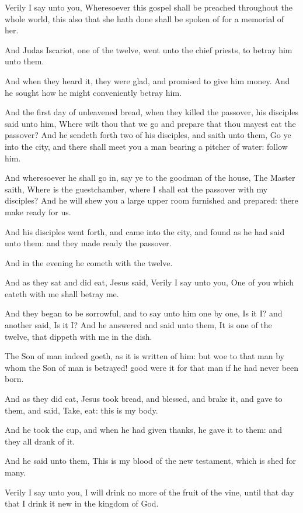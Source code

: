\Verse Verily I say unto you, Wheresoever this gospel shall be preached throughout the whole world, this also that she hath done shall be spoken of for a memorial of her.

\Verse And Judas Iscariot, one of the twelve, went unto the chief priests, to betray him unto them.

\Verse And when they heard it, they were glad, and promised to give him money. And he sought how he might conveniently betray him.

\Verse And the first day of unleavened bread, when they killed the passover, his disciples said unto him, Where wilt thou that we go and prepare that thou mayest eat the passover?  \Verse And he sendeth forth two of his disciples, and saith unto them, Go ye into the city, and there shall meet you a man bearing a pitcher of water: follow him.

\Verse And wheresoever he shall go in, say ye to the goodman of the house, The Master saith, Where is the guestchamber, where I shall eat the passover with my disciples?  \Verse And he will shew you a large upper room furnished and prepared: there make ready for us.

\Verse And his disciples went forth, and came into the city, and found as he had said unto them: and they made ready the passover.

\Verse And in the evening he cometh with the twelve.

\Verse And as they sat and did eat, Jesus said, Verily I say unto you, One of you which eateth with me shall betray me.

\Verse And they began to be sorrowful, and to say unto him one by one, Is it I? and another said, Is it I?  \Verse And he answered and said unto them, It is one of the twelve, that dippeth with me in the dish.

\Verse The Son of man indeed goeth, as it is written of him: but woe to that man by whom the Son of man is betrayed! good were it for that man if he had never been born.

\Verse And as they did eat, Jesus took bread, and blessed, and brake it, and gave to them, and said, Take, eat: this is my body.

\Verse And he took the cup, and when he had given thanks, he gave it to them: and they all drank of it.

\Verse And he said unto them, This is my blood of the new testament, which is shed for many.

\Verse Verily I say unto you, I will drink no more of the fruit of the vine, until that day that I drink it new in the kingdom of God.

